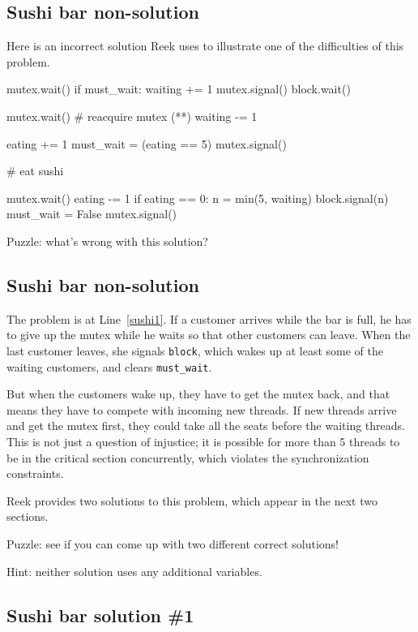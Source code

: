 \documentclass{book}
\begin{document}
\subsection {Sushi bar non-solution}

Here is an incorrect solution Reek uses to illustrate one
of the difficulties of this problem.


\begin{unbreakable}[title={Sushi bar non-solution}]{}
mutex.wait()
if must_wait:
    waiting += 1
    mutex.signal()
    block.wait()

    mutex.wait()      # reacquire mutex (*\label{sushi1}*)
    waiting -= 1

eating += 1
must_wait = (eating == 5)
mutex.signal()

# eat sushi

mutex.wait()
eating -= 1
if eating == 0:
    n = min(5, waiting)
    block.signal(n)
    must_wait = False
mutex.signal()
\end{unbreakable}

Puzzle: what's wrong with this solution?



\subsection {Sushi bar non-solution}

The problem is at Line~\ref{sushi1}.  If a customer arrives
while the bar is full, he has to give up the mutex while he
waits so that other customers can leave.  When the last customer
leaves, she signals {\tt block}, which wakes up at least some
of the waiting customers, and clears {\tt must\_wait}.

But when the customers wake up, they have to get the mutex
back, and that means they have to compete with incoming new
threads.  If new threads arrive and get the mutex first,
they could take all the seats before the waiting threads.
This is not just a question of injustice; it is possible for more
than 5 threads to be in the critical section concurrently, which
violates the synchronization constraints.

Reek provides two solutions to this problem, which appear
in the next two sections.

Puzzle: see if you can come up with two different correct solutions!

Hint: neither solution uses any additional variables.


\subsection {Sushi bar solution \#1}
\end{document}
